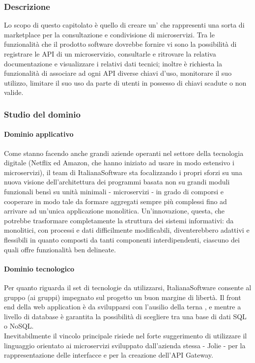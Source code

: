 		\subsubsection{Descrizione}
		Lo scopo di questo capitolato è quello di creare un' che rappresenti una sorta di marketplace per la consultazione e 
		condivisione di microservizi. Tra le funzionalità che il prodotto software dovrebbe fornire vi sono la possibilità di registrare le API 
		di un microservizio, consultarle e ritrovare la relativa documentazione e visualizzare i relativi dati tecnici; inoltre è richiesta la 
		funzionalità di associare ad ogni API diverse chiavi d'uso, monitorare il suo utilizzo, limitare il suo uso da parte di utenti in possesso 
		di chiavi scadute o non valide.
		\subsubsection{Studio del dominio}
			\paragraph{Dominio applicativo}
			Come stanno facendo anche grandi aziende operanti nel settore della tecnologia digitale (Netflix ed Amazon, che hanno iniziato ad usare 
			in modo estensivo i microservizi), il team di ItalianaSoftware sta focalizzando i propri sforzi su una nuova visione dell'architettura 
			dei programmi basata non su grandi moduli funzionali bensì su unità minimali - microservizi - in grado di comporsi e cooperare in modo 
			tale da formare aggregati sempre più complessi fino ad arrivare ad un'unica applicazione monolitica. Un'innovazione, questa, che potrebbe 
			trasformare completamente la struttura dei sistemi informativi: da monolitici, con processi e dati difficilmente modificabili, diventerebbero 
			adattivi e flessibili in quanto composti da tanti componenti interdipendenti, ciascuno dei quali offre funzionalità ben delineate.
			\paragraph{Dominio tecnologico}
			Per quanto riguarda il set di tecnologie da utilizzarsi, ItalianaSoftware consente al gruppo (ai gruppi) impegnato sul progetto un buon 
			margine di libertà. Il front end della web application è da svilupparsi con l'ausilio della terna ,  e  mentre a 
			livello di database è garantita la possibilità di scegliere tra una base di dati SQL o NoSQL.\\
			Inevitabilmente il vincolo principale risiede nel forte suggerimento di utilizzare il linguaggio orientato ai microservizi sviluppato 
			dall'azienda stessa - Jolie - per la rappresentazione delle interfacce e per la creazione dell'API Gateway.
